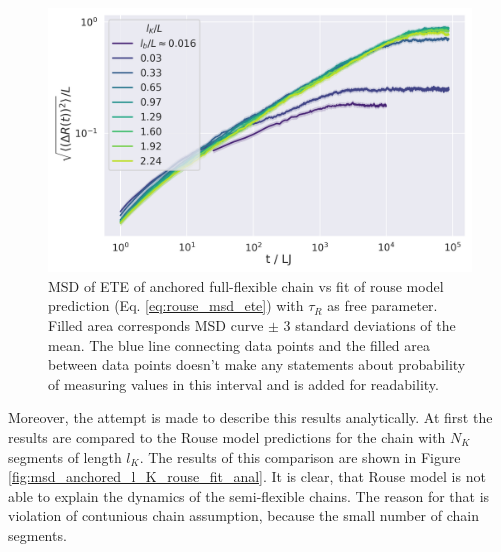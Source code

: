 \documentclass[
    paper=A4,pagesize=automedia,fontsize=12pt,
    BCOR=15mm,DIV=22,
    twoside,headinclude,footinclude=false,
    ngerman,fleqn,             %
    bibliography=totocnumbered,          %
    listof=totoc,                %
    listof=flat,                 %
    cleardoublepage=empty      %
    numbers=endperiod
]{scrartcl}
\begin{document}
\begin{figure}[h]
    \begin{center}
      \includegraphics[width=\columnwidth,trim={0cm 0cm 0cm 0.0cm},clip]{4-exp-delta_R-bare-log.png}
      \caption{\label{fig:msd_anchored_l_K}
      MSD of ETE of anchored full-flexible chain vs fit of rouse model prediction 
      (Eq. \ref{eq:rouse_msd_ete}) with $\tau_R$ as free parameter.
      Filled area corresponds MSD curve $\pm$ 3 standard deviations of the mean. The
      blue line connecting data points and the filled area between data points doesn't make
      any statements about probability of measuring values in this interval and is
      added for readability.
      }
    \end{center}
\end{figure}

Moreover, the attempt is made to describe this results analytically. At first
the results are compared to the Rouse model predictions for the chain
with $N_K$ segments of length $l_K$. The results of this comparison are shown
in Figure \ref{fig:msd_anchored_l_K_rouse_fit_anal}. It is clear, that
Rouse model is not able to explain the dynamics of the semi-flexible chains.
The reason for that is violation of contunious chain assumption, because
the small number of chain segments.
\end{document}
